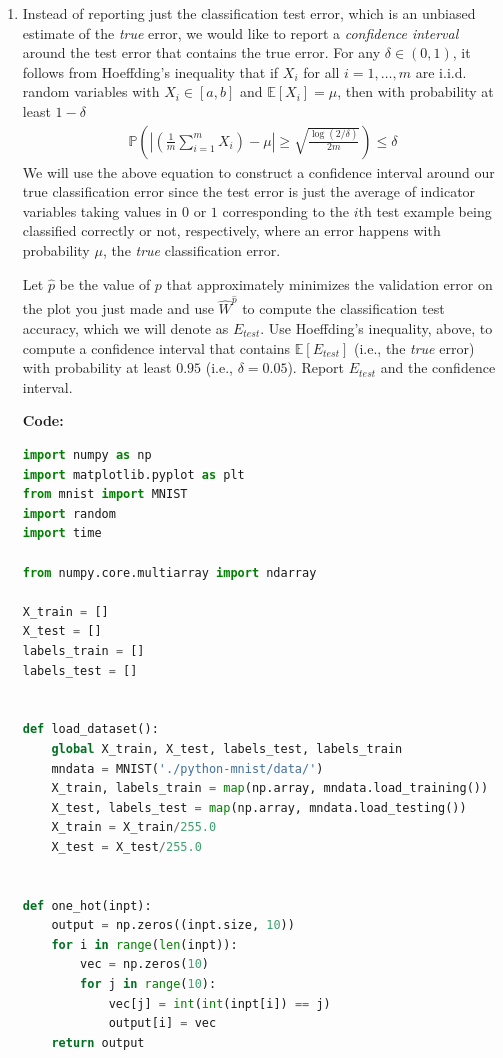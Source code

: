 \documentclass{article}
\newcommand{\1}{\mathbf{1}}
\renewcommand{\P}{\mathbb{P}} %
\def\E{\mathbb{E}}
\def\P{\mathbb{P}}
\begin{document}
\begin{enumerate}
\item Instead of reporting just the classification test error, which is an unbiased estimate of the \emph{true} error, we would like to report a \emph{confidence interval} around the test error that contains the true error.
For any $\delta \in (0,1)$, it follows from Hoeffding's inequality that if $X_i$ for all $i=1,\dots,m$ are i.i.d. random variables with $X_i \in [a,b]$ and $\E[X_i] = \mu$, then with probability at least $1-\delta$ 
\begin{align*}
\P\left( \left| \left(\frac{1}{m} \sum_{i=1}^m X_i\right) - \mu \right| \geq \sqrt{\frac{\log(2/\delta)}{2m}} \right) \leq \delta
\end{align*}
We will use the above equation to construct a confidence interval around our true classification error since the test error is just the average of indicator variables taking values in $0$ or $1$ corresponding to the $i$th test example being classified correctly or not, respectively, where an error happens with probability $\mu$, the \emph{true} classification error. 

Let $\widehat{p}$ be the value of $p$ that approximately minimizes the validation error on the plot you just made and use $\widehat{W}^{\widehat{p}}$ to compute the classification test accuracy, which we will denote as $E_{test}$. 
Use Hoeffding's inequality, above, to compute a confidence interval that contains $\E[E_{test}]$ (i.e., the \emph{true} error) with probability at least $0.95$ (i.e., $\delta=0.05$).
Report $E_{test}$ and the confidence interval. 

\textbf{Code:}
\begin{lstlisting}[language=Python]
import numpy as np
import matplotlib.pyplot as plt
from mnist import MNIST
import random
import time

from numpy.core.multiarray import ndarray

X_train = []
X_test = []
labels_train = []
labels_test = []


def load_dataset():
    global X_train, X_test, labels_test, labels_train
    mndata = MNIST('./python-mnist/data/')
    X_train, labels_train = map(np.array, mndata.load_training())
    X_test, labels_test = map(np.array, mndata.load_testing())
    X_train = X_train/255.0
    X_test = X_test/255.0


def one_hot(inpt):
    output = np.zeros((inpt.size, 10))
    for i in range(len(inpt)):
        vec = np.zeros(10)
        for j in range(10):
            vec[j] = int(int(inpt[i]) == j)
            output[i] = vec
    return output



\end{lstlisting}
\end{enumerate}
\end{document}
